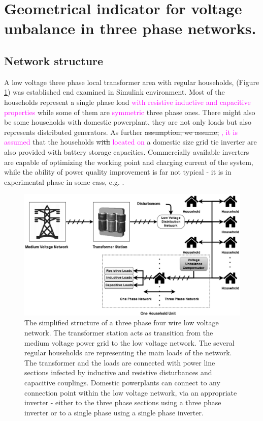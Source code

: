 \section{Geometrical indicator for voltage unbalance in three phase networks.}

\subsection{Network structure}

        A low voltage three phase local transformer area  with regular households, (Figure \ref{fig:network}) was established end examined in Simulink environment.
        Most of the households represent a single phase load \textcolor{magenta}{with resistive inductive and capacitive properties} while some of them are \textcolor{magenta}{symmetric} three phase ones. There might also be some households with domestic powerplant, they are not only loads but also
        represents distributed generators. As further \st{assumption, we assume,} \textcolor{magenta}{, it is assumed} that the households \st{with} \textcolor{magenta}{located on} a domestic size grid tie inverter are also provided with battery storage capacities. Commercially available inverters are capable of optimizing the working point and charging current of the system, while the ability of power quality improvement is far not typical - it is in experimental phase in some cass, e.g. \cite{gorbe2012reduction}.%

        \begin{figure}[!ht]
            \centering
            \includegraphics[width=\textwidth]{Unblance_EPS_Pics/network_gray.eps}
            \caption{The simplified structure of a three phase four wire low voltage network. The transformer station acts as transition from the medium voltage power grid to
            the low voltage network. The several regular households are representing the main loads of the network. The transformer and the loads are connected with power line sections infected by inductive and resistive disturbances and capacitive couplings. Domestic powerplants can connect to any connection point within the low voltage network, via an appropriate inverter - either to the three phase sections using a three phase inverter or to a single phase using a single phase inverter.}
            \label{fig:network}
            \end{figure}

